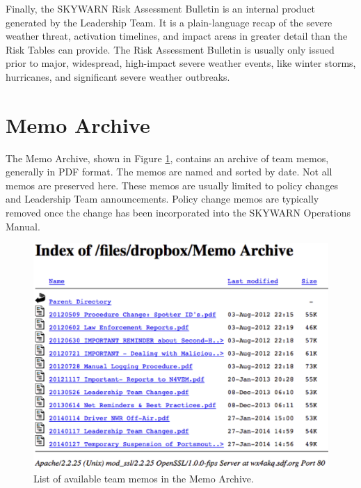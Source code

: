 \documentclass[pdflatex,letterpaper,twoside,12pt]{book}
\begin{document}
Finally, the SKYWARN Risk Assessment Bulletin is an internal product generated by the Leadership Team.  It is a plain-language recap of the severe weather threat, activation timelines, and impact areas in greater detail than the Risk Tables can provide.  The Risk Assessment Bulletin is usually only issued prior to major, widespread, high-impact severe weather events, like winter storms, hurricanes, and significant severe weather outbreaks.


\section{Memo Archive}

The Memo Archive, shown in Figure \ref{fig:ops-memo-list}, contains an archive of team memos, generally in PDF format.  The memos are named and sorted by date.  Not all memos are preserved here.  These memos are usually limited to policy changes and Leadership Team announcements.  Policy change memos are typically removed once the change has been incorporated into the SKYWARN Operations Manual.

\begin{figure}[h]
  \centering
  \includegraphics[width=\textwidth,keepaspectratio=true]{img/ops-memo-list-cropped}
  \caption{List of available team memos in the Memo Archive.\label{fig:ops-memo-list}}
\end{figure}

\end{document}
